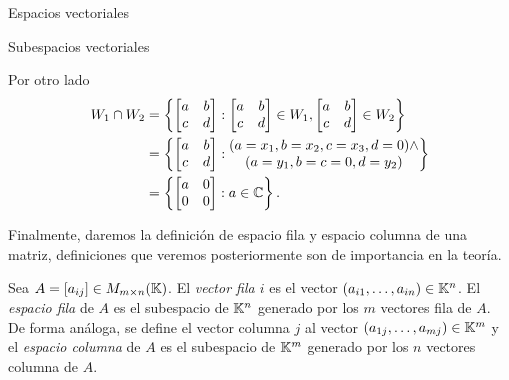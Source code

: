 \begin{chapter}{Espacios vectoriales}
\begin{section}{Subespacios vectoriales}
\begin{ejemplo*}
\begin{enumerate}
            Por otro lado
            \begin{align*}
                W_1 \cap W_2 &= \left\{\begin{bmatrix} a&b\\c&d\end{bmatrix}:  \begin{bmatrix} a&b\\c&d\end{bmatrix} \in W_1, \begin{bmatrix} a&b\\c&d\end{bmatrix} \in W_2\right\} \\
                &= \left\{\begin{bmatrix} a&b\\c&d\end{bmatrix}:  \begin{matrix}
                (a =x_1, b = x_2, c = x_3,d =0)\wedge \\(a = y_1, b=c=0, d= y_2)
                \end{matrix} \right\} \\
                &= \left\{\begin{bmatrix} a&0\\0&0\end{bmatrix}:  a \in \mathbb C\right\} .
            \end{align*}
        \end{enumerate}
    \end{ejemplo*}

    Finalmente, daremos la definición de espacio fila y espacio columna de una matriz, definiciones  que veremos posteriormente son de importancia en la teoría. 

    \begin{definicion}\label{espacio-fila-columna}
        Sea $A = [a_{ij}] \in M_{m \times n}(\mathbb K)$. El \textit{vector fila $i$} es el vector  $(a_{i1},\ldots,a_{in}) \in \mathbb K^n$. El \textit{espacio fila} de $A$ es el subespacio de $\mathbb K^n$ generado por los $m$ vectores fila de $A$.  De forma análoga, se define  el vector columna $j$ al vector $(a_{1j},\ldots,a_{mj}) \in \mathbb K^m$ y  el \textit{espacio columna} de $A$ es el subespacio de $\mathbb K^m$ generado por los $n$ vectores columna de $A$.  
    \end{definicion}


\end{section}
\end{chapter}
